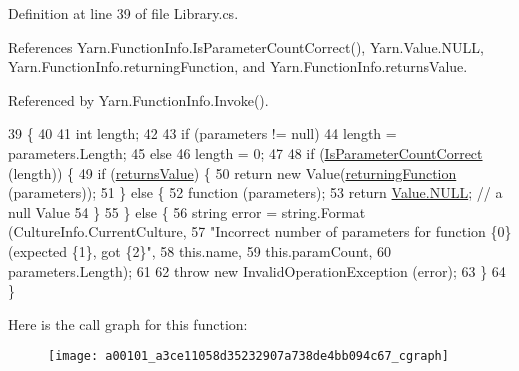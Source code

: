 Definition at line 39 of file Library.\-cs.



References Yarn.\-Function\-Info.\-Is\-Parameter\-Count\-Correct(), Yarn.\-Value.\-N\-U\-L\-L, Yarn.\-Function\-Info.\-returning\-Function, and Yarn.\-Function\-Info.\-returns\-Value.



Referenced by Yarn.\-Function\-Info.\-Invoke().


\begin{DoxyCode}
39                                                          \{
40 
41             \textcolor{keywordtype}{int} length;
42 
43             \textcolor{keywordflow}{if} (parameters != null)
44                 length = parameters.Length;
45             \textcolor{keywordflow}{else}
46                 length = 0;
47 
48             \textcolor{keywordflow}{if} (\hyperlink{a00101_a1ed09ff8aafa230a0d2bbc23cd6cd763}{IsParameterCountCorrect} (length)) \{
49                 \textcolor{keywordflow}{if} (\hyperlink{a00101_acaff044276aa230de7c0b27dd5267bc7}{returnsValue}) \{
50                     \textcolor{keywordflow}{return} \textcolor{keyword}{new} Value(\hyperlink{a00101_a8b6e0e5a875c427a1d947f3c52c308ca}{returningFunction} (parameters));
51                 \} \textcolor{keywordflow}{else} \{
52                     \textcolor{keyword}{function} (parameters);
53                     \textcolor{keywordflow}{return} \hyperlink{a00165_a1ed2964965baca8621c45efa23f37660}{Value.NULL}; \textcolor{comment}{// a null Value}
54                 \}
55             \} \textcolor{keywordflow}{else} \{
56                 \textcolor{keywordtype}{string} error = string.Format (CultureInfo.CurrentCulture,
57                     \textcolor{stringliteral}{"Incorrect number of parameters for function \{0\} (expected \{1\}, got \{2\}"},
58                     this.name,
59                     this.paramCount,
60                     parameters.Length);
61 
62                 \textcolor{keywordflow}{throw} \textcolor{keyword}{new} InvalidOperationException (error);
63             \}
64         \}
\end{DoxyCode}


Here is the call graph for this function\-:
\nopagebreak
\begin{figure}[H]
\begin{center}
\leavevmode
\texttt{[image: a00101\_a3ce11058d35232907a738de4bb094c67\_cgraph]}
\end{center}
\end{figure}




